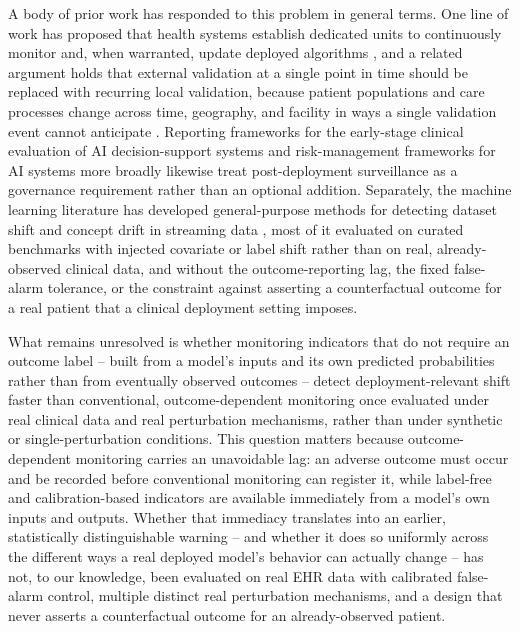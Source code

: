 \documentclass[preprintsapa,article,submit,oneauthor]{Definitions/mdpi}
\begin{document}
A body of prior work has responded to this problem in general terms. One line of work has proposed that health systems establish dedicated units to continuously monitor and, when warranted, update deployed algorithms \citep{feng2022}, and a related argument holds that external validation at a single point in time should be replaced with recurring local validation, because patient populations and care processes change across time, geography, and facility in ways a single validation event cannot anticipate \citep{youssef2023}. Reporting frameworks for the early-stage clinical evaluation of AI decision-support systems \citep{vasey2022} and risk-management frameworks for AI systems more broadly \citep{nist2023} likewise treat post-deployment surveillance as a governance requirement rather than an optional addition. Separately, the machine learning literature has developed general-purpose methods for detecting dataset shift and concept drift in streaming data \citep{rabanser2019,gama2014,lu2019}, most of it evaluated on curated benchmarks with injected covariate or label shift rather than on real, already-observed clinical data, and without the outcome-reporting lag, the fixed false-alarm tolerance, or the constraint against asserting a counterfactual outcome for a real patient that a clinical deployment setting imposes.

What remains unresolved is whether monitoring indicators that do not require an outcome label -- built from a model's inputs and its own predicted probabilities rather than from eventually observed outcomes -- detect deployment-relevant shift faster than conventional, outcome-dependent monitoring once evaluated under real clinical data and real perturbation mechanisms, rather than under synthetic or single-perturbation conditions. This question matters because outcome-dependent monitoring carries an unavoidable lag: an adverse outcome must occur and be recorded before conventional monitoring can register it, while label-free and calibration-based indicators are available immediately from a model's own inputs and outputs. Whether that immediacy translates into an earlier, statistically distinguishable warning -- and whether it does so uniformly across the different ways a real deployed model's behavior can actually change -- has not, to our knowledge, been evaluated on real EHR data with calibrated false-alarm control, multiple distinct real perturbation mechanisms, and a design that never asserts a counterfactual outcome for an already-observed patient.
\end{document}

